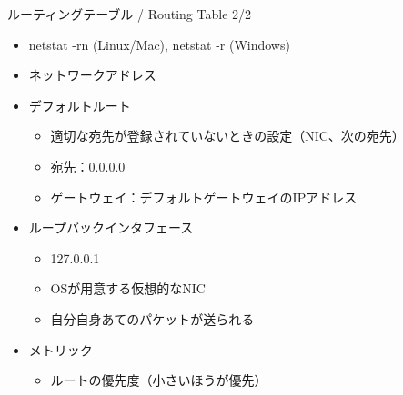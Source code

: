 \documentclass[12pt,aspectratio=169]{beamer}
\begin{document}
\begin{frame}{ルーティングテーブル / Routing Table 2/2}

  \begin{itemize}
    \item netstat -rn (Linux/Mac), netstat -r (Windows)
    \item ネットワークアドレス
    \item デフォルトルート
      \begin{itemize}
        \item 適切な宛先が登録されていないときの設定（NIC、次の宛先）
        \item 宛先：0.0.0.0
        \item ゲートウェイ：デフォルトゲートウェイのIPアドレス
      \end{itemize}
    \item ループバックインタフェース
      \begin{itemize}
        \item 127.0.0.1
        \item OSが用意する仮想的なNIC
        \item 自分自身あてのパケットが送られる
      \end{itemize}
    \item メトリック
      \begin{itemize}
        \item ルートの優先度（小さいほうが優先）
      \end{itemize}

  \end{itemize}

\end{frame}
\end{document}
